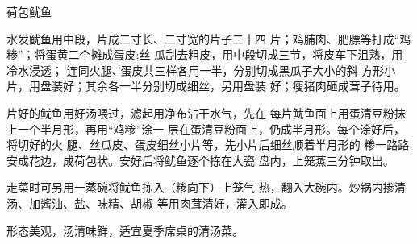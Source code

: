\begin{recipe}{荷包鱿鱼}

\ingredients



\cooking

\step 水发鱿鱼用中段，片成二寸长、二寸宽的片子二十四 片；鸡脯肉、肥膘等打成“鸡糁”；将蛋黄二个摊成蛋皮;丝 瓜刮去粗皮，用中段切成三节，将皮车下沮熟，用冷水浸透； 连同火腿、'蛋皮共三样各用一半，分别切成黑瓜子大小的斜 方形小片，用盘装好；其余各一半分别切成细丝，另用盘装 好；瘦猪肉砸成茸子待用。

片好的鱿鱼用好汤喂过，滤起用净布沾干水气，先在 每片鱿鱼面上用蛋清豆粉抹上一个半月形，再用“鸡糁”涂一 层在蛋清豆粉面上，仍成半月形。每个涂好后，将切好的火 腿、丝瓜皮、蛋皮细丝小片等，先小片后细丝顺着半月形的 糁一路路安成花边，成荷包状。安好后将鱿鱼逐个拣在大瓷 盘内，上笼蒸三分钟取出。

\step 走菜时可另用一蒸碗将鱿鱼拣入（糁向下）上笼气 热，翻入大碗内。炒锅内掺清汤、加酱油、盐、味精、胡椒 等用肉茸清好，灌入即成。

\notes

形态美观，汤清味鲜，适宜夏季席桌的清汤菜。

\end{recipe}

